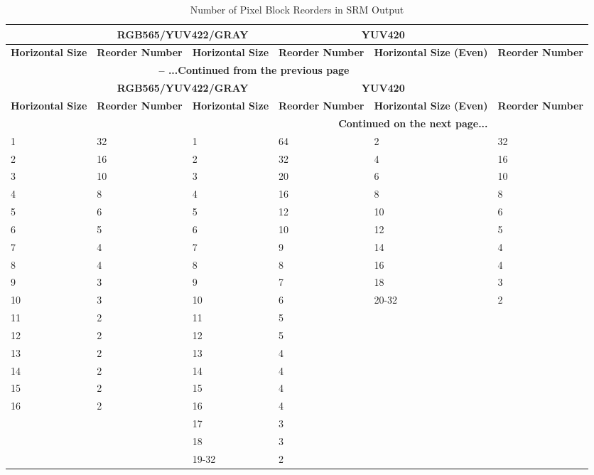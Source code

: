 \documentclass[main\_\_EN.tex]{subfiles}
\begin{document}
\begin{longtable}[c]{ |p{2.2cm}|p{2.2cm}|p{2.2cm}|p{2.2cm}|p{2.2cm}|p{2.2cm}| }
    \caption{Number of Pixel Block Reorders in SRM Output}
    \label{tab:srm_blk_ro_num}\\\hline

    \rowcolor{lightgray}
    \multicolumn{2}{|c|}{\textbf{ARGB8888/RGB888}} & \multicolumn{2}{c|}{\textbf{RGB565/YUV422/GRAY}} & \multicolumn{2}{c|}{\textbf{YUV420}} \\\hline
    \rowcolor{lightgray}
    \textbf{Horizontal Size} & \textbf{Reorder Number} & \textbf{Horizontal Size} & \textbf{Reorder Number} & \textbf{Horizontal Size (Even)} & \textbf{Reorder Number} \\\hline
    \endfirsthead


    \multicolumn{5}{c}{\bfseries \tablename\ \thetable{} -- ...Continued from the previous page}\\\hline
    \rowcolor{lightgray}
    \multicolumn{2}{|c|}{\textbf{ARGB8888/RGB888}} & \multicolumn{2}{c|}{\textbf{RGB565/YUV422/GRAY}} & \multicolumn{2}{c|}{\textbf{YUV420}} \\\hline
    \rowcolor{lightgray}
    \textbf{Horizontal Size} & \textbf{Reorder Number} & \textbf{Horizontal Size} & \textbf{Reorder Number} & \textbf{Horizontal Size (Even)} & \textbf{Reorder Number} \\\hline
    \endhead

    \multicolumn{5}{r}{\textbf{Continued on the next page...}} \\
    \endfoot

    \endlastfoot

        1  & 32 & 1  & 64 & 2  & 32 \\\hline
        2  & 16 & 2  & 32 & 4  & 16 \\\hline
        3  & 10 & 3  & 20 & 6  & 10 \\\hline
        4  & 8  & 4  & 16 & 8  & 8  \\\hline
        5  & 6  & 5  & 12 & 10 & 6  \\\hline
        6  & 5  & 6  & 10 & 12 & 5  \\\hline
        7  & 4  & 7  & 9  & 14 & 4  \\\hline
        8  & 4  & 8  & 8  & 16 & 4  \\\hline
        9  & 3  & 9  & 7  & 18 & 3  \\\hline
        10 & 3  & 10 & 6  & 20-32 & 2 \\\hline
        11 & 2  & 11 & 5  &  &  \\\hline
        12 & 2  & 12 & 5  &  &  \\\hline
        13 & 2  & 13 & 4  &  &  \\\hline
        14 & 2  & 14 & 4  &  &  \\\hline
        15 & 2  & 15 & 4  &  &  \\\hline
        16 & 2  & 16 & 4  &  &  \\\hline
           &    & 17 & 3  &  &  \\\hline
           &    & 18 & 3  &  &  \\\hline
           &    & 19-32 & 2 &  &  \\\hline


\end{longtable}
\end{document}
